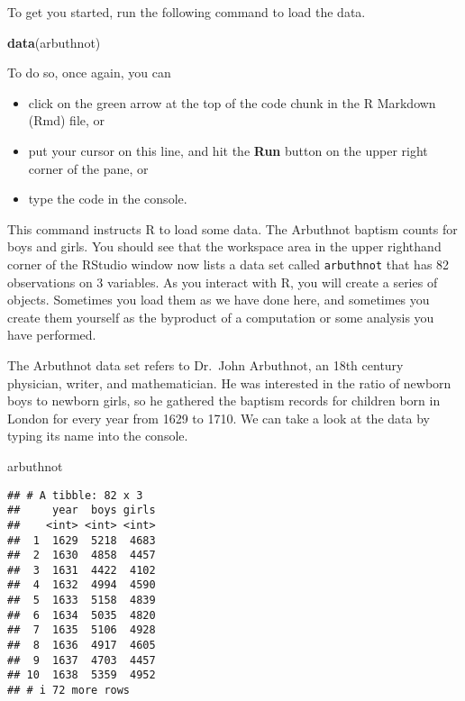 \documentclass[
]{article}
\newenvironment{Shaded}{\begin{snugshade}}{\end{snugshade}}
\newcommand{\FunctionTok}[1]{\textcolor[rgb]{0.13,0.29,0.53}{\textbf{#1}}}
\newcommand{\NormalTok}[1]{#1}
\providecommand{\tightlist}{%
  \setlength{\itemsep}{0pt}\setlength{\parskip}{0pt}}
\begin{document}
To get you started, run the following command to load the data.

\begin{Shaded}
\begin{Highlighting}[]
\FunctionTok{data}\NormalTok{(arbuthnot)}
\end{Highlighting}
\end{Shaded}

To do so, once again, you can

\begin{itemize}
\tightlist
\item
  click on the green arrow at the top of the code chunk in the R
  Markdown (Rmd) file, or
\item
  put your cursor on this line, and hit the \textbf{Run} button on the
  upper right corner of the pane, or
\item
  type the code in the console.
\end{itemize}

This command instructs R to load some data. The Arbuthnot baptism counts
for boys and girls. You should see that the workspace area in the upper
righthand corner of the RStudio window now lists a data set called
\texttt{arbuthnot} that has 82 observations on 3 variables. As you
interact with R, you will create a series of objects. Sometimes you load
them as we have done here, and sometimes you create them yourself as the
byproduct of a computation or some analysis you have performed.

The Arbuthnot data set refers to Dr.~John Arbuthnot, an 18th century
physician, writer, and mathematician. He was interested in the ratio of
newborn boys to newborn girls, so he gathered the baptism records for
children born in London for every year from 1629 to 1710. We can take a
look at the data by typing its name into the console.

\begin{Shaded}
\begin{Highlighting}[]
\NormalTok{arbuthnot}
\end{Highlighting}
\end{Shaded}

\begin{verbatim}
## # A tibble: 82 x 3
##     year  boys girls
##    <int> <int> <int>
##  1  1629  5218  4683
##  2  1630  4858  4457
##  3  1631  4422  4102
##  4  1632  4994  4590
##  5  1633  5158  4839
##  6  1634  5035  4820
##  7  1635  5106  4928
##  8  1636  4917  4605
##  9  1637  4703  4457
## 10  1638  5359  4952
## # i 72 more rows
\end{verbatim}
\end{document}
